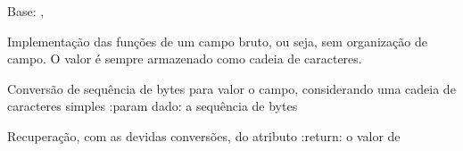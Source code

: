\documentclass[letterpaper,10pt,brazil]{sphinxmanual}
\begin{document}
\begin{fulllineitems}
\label{\detokenize{estrutarq.campo:estrutarq.campo.campo_comum.CampoBruto}}
\pysigstartsignatures
{}
\pysigstopsignatures
\sphinxAtStartPar
Base: {\hyperref[\detokenize{estrutarq.dado:estrutarq.dado.DadoBruto}]{}}, {\hyperref[\detokenize{estrutarq.campo:estrutarq.campo.campo_comum.CampoBasico}]{}}

\sphinxAtStartPar
Implementação das funções de um campo bruto, ou seja, sem organização
de campo. O valor é sempre armazenado como cadeia de caracteres.

\begin{fulllineitems}
\label{\detokenize{estrutarq.campo:estrutarq.campo.campo_comum.CampoBruto.bytes_para_valor}}
\pysigstartsignatures
{}
\pysigstopsignatures
\sphinxAtStartPar
Conversão de sequência de bytes para valor o campo, considerando
uma cadeia de caracteres simples
:param dado: a sequência de bytes

\end{fulllineitems}


\begin{fulllineitems}
\label{\detokenize{estrutarq.campo:estrutarq.campo.campo_comum.CampoBruto.valor}}
\pysigstartsignatures
{}
\pysigstopsignatures
\sphinxAtStartPar
Recuperação, com as devidas conversões, do atributo 
:return: o valor de 


\end{fulllineitems}
\end{fulllineitems}
\end{document}
